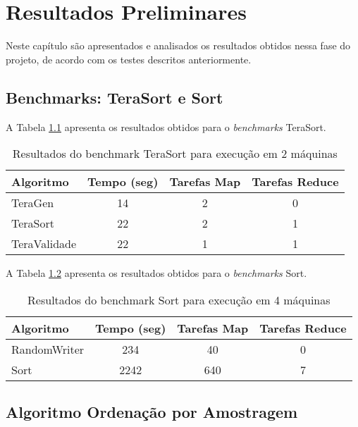 \chapter{Resultados Preliminares}
\label{cap:resultados}

Neste capítulo são apresentados e analisados os resultados obtidos nessa fase do projeto, de acordo com os testes descritos anteriormente.

\section{Benchmarks: TeraSort e Sort}

A Tabela  \ref{tab:TeraSort} apresenta os resultados obtidos para o \textit{benchmarks} TeraSort. 

\begin{table}[htbp]
\caption{Resultados do benchmark TeraSort para execução em 2 máquinas}
\begin{center}
\begin{tabular}{|l|ccc|} \hline
Algoritmo 		&Tempo (seg)	 	&Tarefas Map 	&Tarefas Reduce \\ \hline \hline
TeraGen 			&14			&2					&0						\\ \hline 
TeraSort			&22			&2					&1						\\ \hline 
TeraValidade 	&22			&1					&1						\\ \hline 
\end{tabular}
\end{center}
\label{tab:TeraSort}
\end{table}

A Tabela \ref{tab:Sort} apresenta os resultados obtidos para o \textit{benchmarks} Sort. 

\begin{table}[htbp]
\caption{Resultados do benchmark Sort para execução em 4 máquinas}
\begin{center}
\begin{tabular}{|l|ccc|} \hline
Algoritmo 		&Tempo (seg) 	&Tarefas Map 	&Tarefas Reduce\\ \hline \hline
RandomWriter 	&234				&40					&0						\\ \hline 
Sort					&2242				&640				&7						\\ \hline 
\end{tabular}
\end{center}
\label{tab:Sort}
\end{table}

\section{Algoritmo Ordenação por Amostragem}

